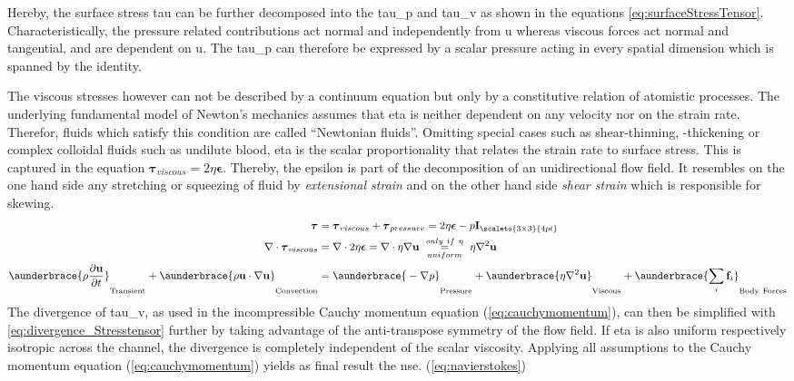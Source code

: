 Hereby, the surface stress \gls{tau} can be further decomposed into the \gls{tau_p} and \gls{tau_v} as shown in the equations \cref{eq:surfaceStressTensor}. Characteristically, the pressure related contributions act normal and independently from \gls{u} whereas viscous forces act normal and tangential, and are dependent on \gls{u}. The \gls{tau_p} can therefore be expressed by a scalar pressure acting in every spatial dimension which is spanned by the identity. 

The viscous stresses however can not be described by a continuum equation but only by a constitutive relation of atomistic processes. The underlying fundamental model of Newton's mechanics assumes that \gls{eta} is neither dependent on any velocity nor on the strain rate. Therefor, fluids which satisfy this condition are called ``Newtonian fluids''. Omitting special cases such as shear-thinning, -thickening or complex colloidal fluids such as undilute blood, \gls{eta} is the scalar proportionality that relates the strain rate to surface stress.\cite{lit:fluidic:kirby} This is captured in the equation $\boldsymbol{\tau}_{viscous} = 2\eta \mathbf{\epsilon} $. Thereby, the \gls{epsilon} is part of the decomposition of an unidirectional flow field. It resembles on the one hand side any stretching or squeezing of fluid by \textit{extensional strain} and on the other hand side \textit{shear strain} which is responsible for skewing.\cite{lit:fluidic:kirby}
\begin{align}
	\boldsymbol{\tau} &= \boldsymbol{\tau}_{viscous} +  \boldsymbol{\tau}_{pressure} = 2\eta \boldsymbol{\epsilon} - p \mathbf{I}_{\scaleto{3 \times 3}{4pt}} \label{eq:surfaceStressTensor}\\
	\nabla \cdot \boldsymbol{\tau}_{viscous} &= \nabla \cdot 2\eta \boldsymbol{\epsilon} = \nabla \cdot \eta \nabla \mathbf{u} \ \underset{uniform}{\overset{only \ if \ \eta}{=}} \ \eta \nabla^2 \mathbf{u} 	\label{eq:divergence_Stresstensor} \\
	\aunderbrace{\vphantom{\sum_{i}} \rho \frac{\partial \mathbf{u}}{\partial t}}_{\mathrm{Transient}} + \aunderbrace{\vphantom{\sum_{i}}\rho\mathbf{u} \cdot \nabla \mathbf{u}}_{\mathrm{Convection}} &= \aunderbrace{\vphantom{\sum_{i}}-\nabla p}_{\mathrm{Pressure}} + \aunderbrace{\vphantom{\sum_{i}}\eta \nabla^2 \mathbf{u}}_{\mathrm{Viscous}} + \aunderbrace{\sum_{i}\mathbf{f}_i}_{\mathrm{Body \ Forces}} \label{eq:navierstokes}
\end{align}
The divergence of \gls{tau_v}, as used in the incompressible Cauchy momentum equation (\cref{eq:cauchymomentum}), can then be simplified with \cref{eq:divergence_Stresstensor} further by taking advantage of the anti-transpose symmetry of the flow field. If \gls{eta} is also uniform respectively isotropic across the channel, the divergence is completely independent of the scalar viscosity.  Applying all assumptions to the Cauchy momentum equation (\cref{eq:cauchymomentum}) yields as final result the \gls{nse}. (\cref{eq:navierstokes}) 

